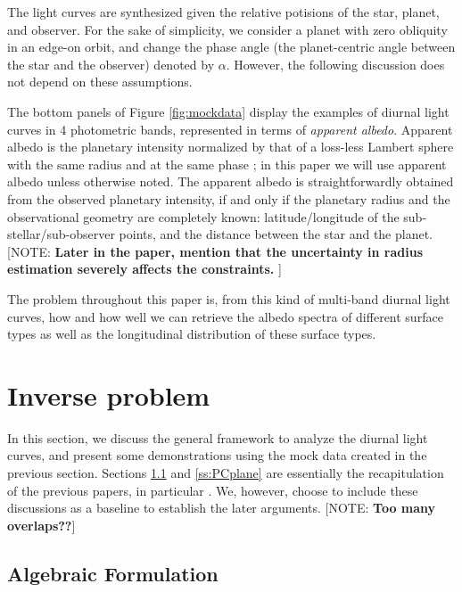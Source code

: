 \documentclass[iop,numberedappendix,apj,]{emulateapj}
\def\memoYF#1{\color{red}[NOTE: {\bf #1}]\color{black}}
\begin{document}
The light curves are synthesized given the relative potisions of the star, planet, and observer.  
For the sake of simplicity, we consider a planet with zero obliquity in an edge-on orbit, and change the phase angle (the planet-centric angle between the star and the observer) denoted by $\alpha $. 
However, the following discussion does not depend on these assumptions. 

The bottom panels of Figure \ref{fig:mockdata} display the examples of diurnal light curves in 4 photometric bands, represented in terms of {\it apparent albedo}. 
Apparent albedo is the planetary intensity normalized by that of a loss-less Lambert sphere with the same radius and at the same phase \citep{Qiu2003, Seager2010}; in this paper we will use apparent albedo unless otherwise noted. 
The apparent albedo is straightforwardly obtained from the observed planetary intensity, if and only if the planetary radius and the observational geometry are completely known: latitude/longitude of the sub-stellar/sub-observer points, and the distance between the star and the planet. 
\memoYF{Later in the paper, mention that the uncertainty in radius estimation severely affects the constraints. }

The problem throughout this paper is, from this kind of multi-band diurnal light curves, how and how well we can retrieve the albedo spectra of different surface types as well as the longitudinal distribution of these surface types. 


\section{Inverse problem}
\label{s:frame}

In this section, we discuss the general framework to analyze the diurnal light curves, and present some demonstrations using the mock data created in the previous section. 
Sections \ref{ss:model} and \ref{ss:PCplane} are essentially the recapitulation of the previous papers, in particular \citet{Cowan2013} \citep[but see also][]{Cowan2009,Cowan2011,Fujii2010,Fujii2011}.  
We, however, choose to include these discussions as a baseline to establish the later arguments. 
\memoYF{Too many overlaps??}

\subsection{Algebraic Formulation}
\label{ss:model}
\end{document}

